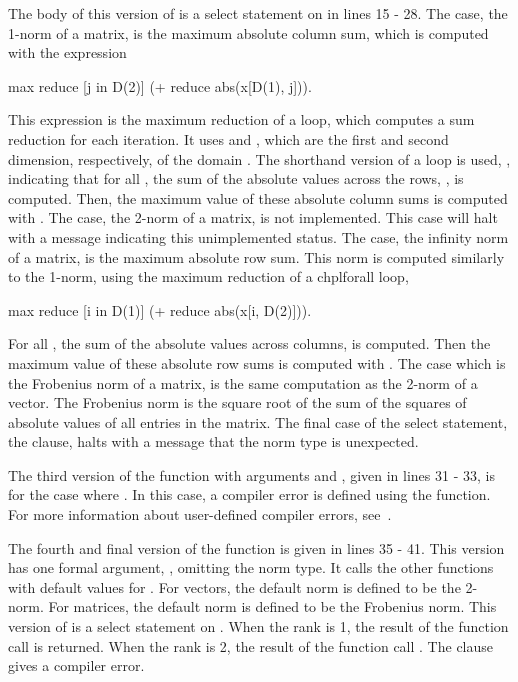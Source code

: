 The body of this version of 
is a select statement on  in lines 15 - 28.  The  case, 
the 1-norm of a matrix, is the maximum absolute column sum, which is computed 
with the expression 
\begin{chapel}
max reduce [j in D(2)] (+ reduce abs(x[D(1), j])).
\end{chapel}
This expression is the maximum reduction of a  loop, which computes
a sum reduction for each iteration.  
It uses  and , which are the first and second dimension,
respectively, of the domain .  The shorthand version of a 
loop is used, \chpl{[j in D(2)]}, indicating that
for all , the sum
of the absolute values across the rows, , is computed. 
Then, the maximum value of these  absolute column sums is computed with
.  The  case, the 2-norm of a matrix, is not
implemented.  This case will halt with a message indicating this unimplemented
status.  The  case, the infinity norm of a matrix, is the maximum
absolute row sum.  This norm is computed similarly to the 1-norm, using the maximum
reduction of a chpl{forall} loop, 
\begin{chapel}
max reduce [i in D(1)] (+ reduce abs(x[i, D(2)])).  
\end{chapel}
For all , the sum of the absolute values across columns,
 is computed.  Then the maximum value of these
 absolute row sums is computed with .  The 
case which is the Frobenius norm of a matrix, is the same computation as the
2-norm of a vector.  The Frobenius norm is the square root of the sum of the
squares of absolute values of all entries in the matrix.  The final case of
the select statement, the  clause, halts with a message that
the norm type is unexpected.

The third version of the  function with arguments 
and , given in lines 31 - 33, is for the case where .
In this case, a compiler error is defined using the 
function.  For more information about user-defined compiler errors, 
see~.

The fourth and final version of the  function is given in lines
35 - 41.  This version has one formal argument, , omitting the norm
type.  It calls the other  functions with default values for 
.  For vectors, the default norm is defined to be the 2-norm.
For matrices, the default norm is defined to be the Frobenius norm.  This 
version of  is a select statement on .  When the rank 
is 1, the result of the function call  is returned.  
When the rank is 2, the result of the function call . 
The  clause gives a compiler error.

